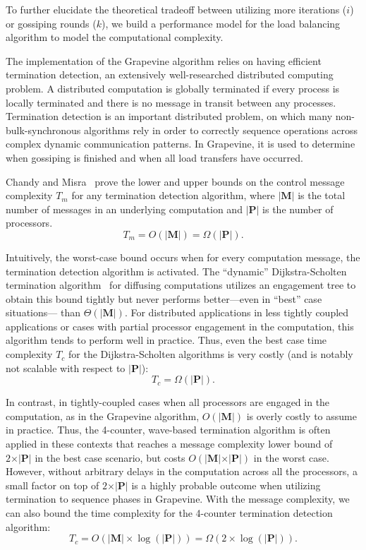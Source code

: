 To further elucidate the theoretical tradeoff between utilizing more iterations
($i$) or gossiping rounds ($k$), we build a performance model for the load
balancing algorithm to model the computational complexity.

The implementation of the \textsf{Grapevine} algorithm relies on having
efficient termination detection, an extensively well-researched distributed
computing problem. A distributed computation is globally terminated if every
process is locally terminated and there is no message in transit between any
processes. Termination detection is an important distributed problem,
on which many non-bulk-synchronous algorithms rely in order to
correctly sequence operations across complex dynamic communication
patterns.
In \textsf{Grapevine}, it is used to determine when gossiping is
finished and when all load transfers have occurred.

Chandy and Misra~\cite{chandy1986processes} prove the lower and upper bounds on
the control message complexity $T_m$ for any termination detection algorithm,
where $\vert\mathbf{M}\vert$ is the total number of messages in an underlying computation and $\vert\mathbf{P}\vert$
is the number of processors.
\[
T_m = O(\vert\mathbf{M}\vert) = \Omega(\vert\mathbf{P}\vert).
\]

Intuitively, the worst-case bound occurs when for every computation message, the
termination detection algorithm is activated. The ``dynamic'' Dijkstra-Scholten
termination algorithm~\cite{dijkstra1980termination} for diffusing computations
utilizes an engagement tree to obtain this bound tightly but never performs
better---even in ``best'' case situations--- than $\Theta(\vert\mathbf{M}\vert)$. For distributed
applications in less tightly coupled applications or cases with partial
processor engagement in the computation, this algorithm tends to perform well in
practice. Thus, even the best case time complexity $T_c$ for the
Dijkstra-Scholten algorithms is very costly (and is notably not scalable with
respect to $\vert\mathbf{P}\vert$):
\[
T_c = \Omega(\vert\mathbf{P}\vert).
\]

In contrast, in tightly-coupled cases when all processors are engaged in the
computation, as in the \textsf{Grapevine} algorithm, $O(\vert\mathbf{M}\vert)$ is overly costly to
assume in practice. Thus, the 4-counter, wave-based termination algorithm is
often applied in these contexts that reaches a message complexity lower bound of
$2\times \vert\mathbf{P}\vert$ in the best case scenario, but costs $O(\vert\mathbf{M}\vert\times \vert\mathbf{P}\vert)$ in the worst
case. However, without arbitrary delays in the computation across all the
processors, a small factor on top of $2\times \vert\mathbf{P}\vert$ is a highly probable outcome
when utilizing termination to sequence phases in \textsf{Grapevine}. With the
message complexity, we can also bound the time complexity for the 4-counter
termination detection algorithm:
\[
T_c = O(\vert\mathbf{M}\vert\times \log(\vert\mathbf{P}\vert)) = \Omega(2\times \log(\vert\mathbf{P}\vert)).
\]

